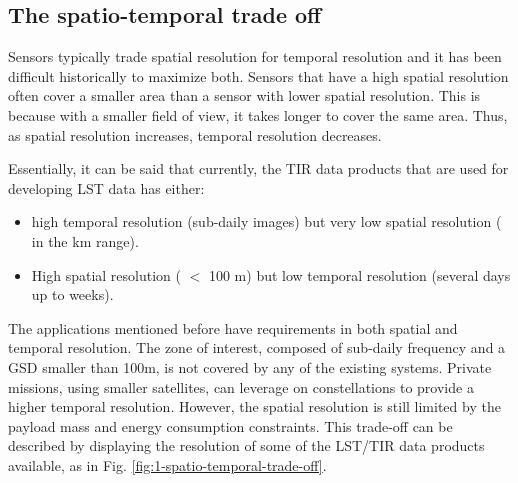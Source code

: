     \subsection{The spatio-temporal trade off}

        Sensors typically trade spatial resolution for temporal resolution and  it has been difficult historically to maximize both.
        Sensors that have a high spatial resolution often cover a smaller area than a sensor with lower spatial resolution.
        This is because with a smaller field of view, it takes longer to cover the same area. Thus, as spatial resolution increases, temporal resolution decreases.

        Essentially, it can be said that currently, the TIR data products that are used for developing LST data has either: 
        
        \begin{itemize}
            \item high temporal resolution (sub-daily images) but very low spatial resolution ( in the km range).
            \item High spatial resolution ( $<$ 100 m) but low temporal resolution (several days up to weeks).
        \end{itemize}

        The applications mentioned before have requirements in both spatial and temporal resolution. 
        The zone of interest, composed of sub-daily frequency and a GSD smaller than 100m, is not covered by any of the existing systems.
        Private missions, using smaller satellites, can leverage on constellations  to provide a higher temporal resolution.
        However, the spatial resolution is still limited by the payload mass and energy consumption constraints.
        This trade-off can be described by displaying the resolution of some of the LST/TIR data products available, as in Fig. \ref{fig:1-spatio-temporal-trade-off}. 


